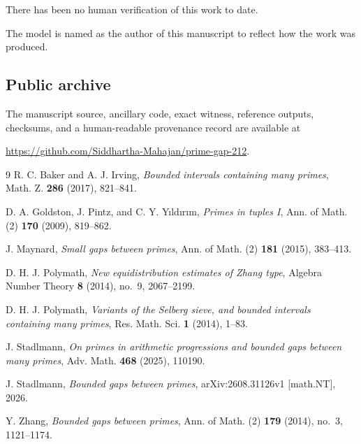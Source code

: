 \documentclass[11pt,reqno]{amsart}
\theoremstyle{definition}
\theoremstyle{remark}
\numberwithin{equation}{section}
\begin{document}
There has been no human verification of this work to date.

The model is named as the author of this manuscript to reflect how
the work was produced.

\subsection{Public archive}
The manuscript source, ancillary code, exact witness, reference outputs,
checksums, and a human-readable provenance record are available at
\begin{center}
\url{https://github.com/Siddhartha-Mahajan/prime-gap-212}.
\end{center}

\begin{thebibliography}{9}
R. C. Baker and A. J. Irving,
\emph{Bounded intervals containing many primes},
Math. Z. \textbf{286} (2017), 821--841.

D. A. Goldston, J. Pintz, and C. Y. Y\i ld\i r\i m,
\emph{Primes in tuples I},
Ann. of Math. (2) \textbf{170} (2009), 819--862.

J. Maynard,
\emph{Small gaps between primes},
Ann. of Math. (2) \textbf{181} (2015), 383--413.

D. H. J. Polymath,
\emph{New equidistribution estimates of Zhang type},
Algebra Number Theory \textbf{8} (2014), no.~9, 2067--2199.

D. H. J. Polymath,
\emph{Variants of the Selberg sieve, and bounded intervals containing many primes},
Res. Math. Sci. \textbf{1} (2014), 1--83.

J. Stadlmann,
\emph{On primes in arithmetic progressions and bounded gaps between many primes},
Adv. Math. \textbf{468} (2025), 110190.

J. Stadlmann,
\emph{Bounded gaps between primes},
arXiv:2608.31126v1 [math.NT], 2026.

Y. Zhang,
\emph{Bounded gaps between primes},
Ann. of Math. (2) \textbf{179} (2014), no.~3, 1121--1174.
\end{thebibliography}
\end{document}
